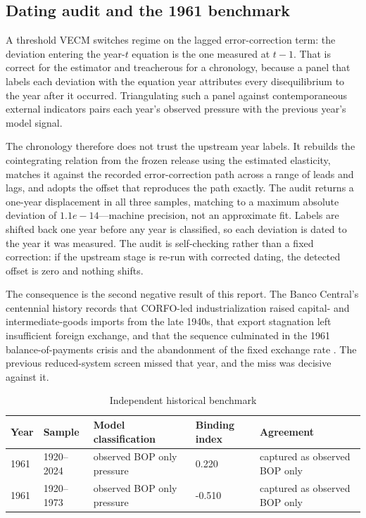\documentclass[11pt]{article}
\begin{document}
\FloatBarrier
\subsection{Dating audit and the 1961 benchmark}
\label{sec:dating}

A threshold VECM switches regime on the lagged error-correction term: the deviation entering the year-$t$ equation is the one measured at $t-1$. That is correct for the estimator and treacherous for a chronology, because a panel that labels each deviation with the equation year attributes every disequilibrium to the year after it occurred. Triangulating such a panel against contemporaneous external indicators pairs each year's observed pressure with the previous year's model signal.

The chronology therefore does not trust the upstream year labels. It rebuilds the cointegrating relation from the frozen release using the estimated elasticity, matches it against the recorded error-correction path across a range of leads and lags, and adopts the offset that reproduces the path exactly. The audit returns a one-year displacement in all three samples, matching to a maximum absolute deviation of $1.1e-14$---machine precision, not an approximate fit. Labels are shifted back one year before any year is classified, so each deviation is dated to the year it was measured. The audit is self-checking rather than a fixed correction: if the upstream stage is re-run with corrected dating, the detected offset is zero and nothing shifts.

The consequence is the second negative result of this report. The Banco Central's centennial history records that CORFO-led industrialization raised capital- and intermediate-goods imports from the late 1940s, that export stagnation left insufficient foreign exchange, and that the sequence culminated in the 1961 balance-of-payments crisis and the abandonment of the fixed exchange rate \citep{bcch2025}. The previous reduced-system screen missed that year, and the miss was decisive against it.

\begin{table}[H]
\centering
\caption{Independent historical benchmark}
\label{tab:benchmark}
\begin{tabular}{p{1.4cm}p{2.4cm}p{4.4cm}p{2.4cm}p{4.0cm}}
\toprule
\textbf{Year} & \textbf{Sample} & \textbf{Model classification} & \textbf{Binding index} & \textbf{Agreement} \\
\midrule
1961 & 1920--2024 & observed BOP only pressure & 0.220 & captured as observed BOP only \\
1961 & 1920--1973 & observed BOP only pressure & -0.510 & captured as observed BOP only \\
\bottomrule
\end{tabular}
\end{table}
\end{document}
